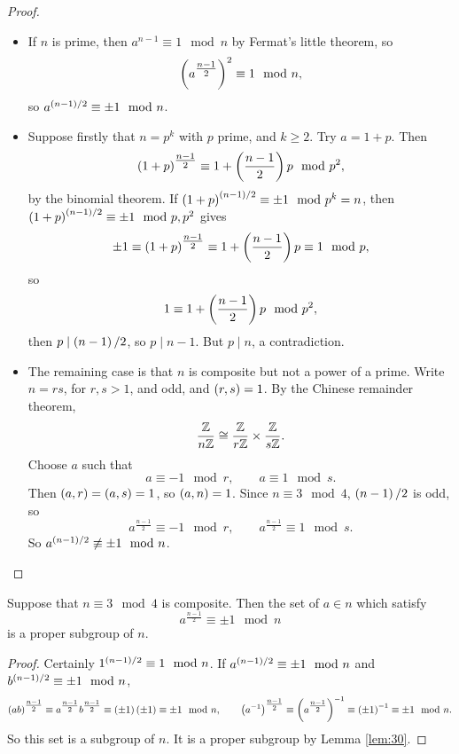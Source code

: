 \begin{proof}
\hfill
\begin{itemize}
\item If $ n $ is prime, then $ a^{n - 1} \equiv 1 \mod n $ by Fermat's little theorem, so
$$ \left( a^{\tfrac{n - 1}{2}} \right)^2 \equiv 1 \mod n, $$
so $ a^{\left( n - 1 \right) / 2} \equiv \pm 1 \mod n $.
\item Suppose firstly that $ n = p^k $ with $ p $ prime, and $ k \ge 2 $. Try $ a = 1 + p $. Then
$$ \left( 1 + p \right)^{\tfrac{n - 1}{2}} \equiv 1 + \left( \dfrac{n - 1}{2} \right)p \mod p^2, $$
by the binomial theorem. If $ \left( 1 + p \right)^{\left( n - 1 \right) / 2} \equiv \pm 1 \mod p^k = n $, then $ \left( 1 + p \right)^{\left( n - 1 \right) / 2} \equiv \pm 1 \mod p, p^2 $ gives
$$ \pm 1 \equiv \left( 1 + p \right)^{\tfrac{n - 1}{2}} \equiv 1 + \left( \dfrac{n - 1}{2} \right)p \equiv 1 \mod p, $$
so
$$ 1 \equiv 1 + \left( \dfrac{n - 1}{2} \right)p \mod p^2, $$
then $ p \mid \left( n - 1 \right) / 2 $, so $ p \mid n - 1 $. But $ p \mid n $, a contradiction.
\item The remaining case is that $ n $ is composite but not a power of a prime. Write $ n = rs $, for $ r, s > 1 $, and odd, and $ \left( r, s \right) = 1 $. By the Chinese remainder theorem,
$$ \dfrac{\mathbb{Z}}{n\mathbb{Z}} \cong \dfrac{\mathbb{Z}}{r\mathbb{Z}} \times \dfrac{\mathbb{Z}}{s\mathbb{Z}}. $$
Choose $ a $ such that
$$ a \equiv -1 \mod r, \qquad a \equiv 1 \mod s. $$
Then $ \left( a, r \right) = \left( a, s \right) = 1 $, so $ \left( a, n \right) = 1 $. Since $ n \equiv 3 \mod 4 $, $ \left( n - 1 \right) / 2 $ is odd, so
$$ a^{\tfrac{n - 1}{2}} \equiv -1 \mod r, \qquad a^{\tfrac{n - 1}{2}} \equiv 1 \mod s. $$
So $ a^{\left( n - 1 \right) / 2} \not\equiv \pm 1 \mod n $.
\end{itemize}
\end{proof}

\begin{lemma}
\label{lem:31}
Suppose that $ n \equiv 3 \mod 4 $ is composite. Then the set of $ a \in \unit{n} $ which satisfy
$$ a^{\tfrac{n - 1}{2}} \equiv \pm 1 \mod n $$
is a proper subgroup of $ \unit{n} $.
\end{lemma}

\begin{proof}
Certainly $ 1^{\left( n - 1 \right) / 2} \equiv 1 \mod n $. If $ a^{\left( n - 1 \right) / 2} \equiv \pm 1 \mod n $ and $ b^{\left( n - 1 \right) / 2} \equiv \pm 1 \mod n $,
$$ \left( ab \right)^{\tfrac{n - 1}{2}} \equiv a^{\tfrac{n - 1}{2}}b^{\tfrac{n - 1}{2}} \equiv \left( \pm 1 \right)\left( \pm 1 \right) \equiv \pm 1 \mod n, \qquad \left( a^{-1} \right)^{\tfrac{n - 1}{2}} \equiv \left( a^{\tfrac{n - 1}{2}} \right)^{-1} \equiv \left( \pm 1 \right)^{-1} \equiv \pm 1 \mod n. $$
So this set is a subgroup of $ \unit{n} $. It is a proper subgroup by Lemma \ref{lem:30}.
\end{proof}

